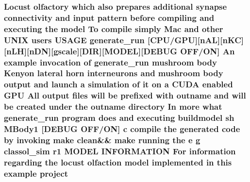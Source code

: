 \hypertarget{userproject_2MBody1__project_2README_8txt_a6be7686af1c095c33166a32d892865dc}{
\subsubsection[{project}]{\setlength{\rightskip}{0pt plus 5cm}Locust olfactory which also prepares additional synapse connectivity and input pattern before compiling and executing the {\bf model} To compile simply Mac and other U\+N\+I\+X users U\+S\+A\+G\+E {\bf generate\+\_\+run} \mbox{[}{\bf C\+P\+U}/{\bf G\+P\+U}\mbox{]}\mbox{[}n\+A\+L\mbox{]}\mbox{[}n\+K\+C\mbox{]}\mbox{[}n\+L\+H\mbox{]}\mbox{[}n\+D\+N\mbox{]}\mbox{[}gscale\mbox{]}\mbox{[}D\+I\+R\mbox{]}\mbox{[}M\+O\+D\+E\+L\mbox{]}\mbox{[}D\+E\+B\+U\+G O\+F\+F/O\+N\mbox{]} An example invocation of {\bf generate\+\_\+run} mushroom body Kenyon lateral horn {\bf interneurons} and mushroom body output and launch a simulation of {\bf it} on a C\+U\+D\+A enabled {\bf G\+P\+U} All output files will be prefixed {\bf with} outname and will be created under the outname {\bf directory} In more what {\bf generate\+\_\+run} program does and executing buildmodel sh M\+Body1 \mbox{[}D\+E\+B\+U\+G O\+F\+F/O\+N\mbox{]} c compile the generated {\bf code} by invoking make clean\&\& make running the e g classol\+\_\+sim r1 M\+O\+D\+E\+L I\+N\+F\+O\+R\+M\+A\+T\+I\+O\+N For information regarding the locust olfaction {\bf model} implemented {\bf in} this example project}}\label{userproject_2MBody1__project_2README_8txt_a6be7686af1c095c33166a32d892865dc}
